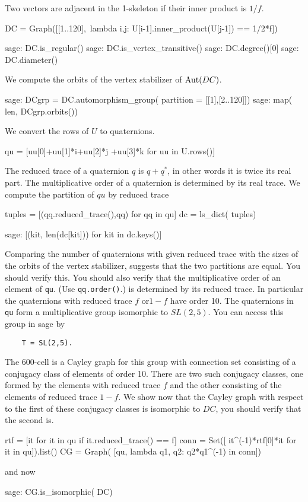 Two vectors are adjacent in the 1-skeleton if their inner product is $1/f$.
\begin{sageblock}
    DC = Graph([[1..120],\
     lambda i,j: U[i-1].inner_product(U[j-1]) == 1/2*f])
\end{sageblock}

\begin{sageexample}
sage: DC.is_regular()
sage: DC.is_vertex_transitive()
sage: DC.degree()[0]
sage: DC.diameter()
\end{sageexample}

We compute the orbits of the vertex stabilizer of $\mathrm{Aut}(DC)$.
\begin{sageexample}
sage: DCgrp = DC.automorphism_group( partition = [[1],[2..120]])
sage: map( len, DCgrp.orbits())
\end{sageexample}

We convert the rows of $U$ to quaternions.
\begin{sageblock}
qu = [uu[0]+uu[1]*i+uu[2]*j +uu[3]*k for uu in U.rows()]
\end{sageblock}
The reduced trace of a quaternion $q$ is $q+q^*$, in other words it is
twice its real part. The multiplicative order of a quaternion is determined
by its real trace. We compute the partition of $qu$ by reduced trace
\begin{sageblock}
tuples = [(qq.reduced_trace(),qq) for qq in qu]
dc = ls_dict( tuples)
\end{sageblock}

\begin{sageexample}
sage: [(kit, len(dc[kit])) for kit in dc.keys()]
\end{sageexample}
Comparing the number of quaternions with given reduced trace with the
sizes of the orbits of the vertex stabilizer, suggests that the two partitions
are equal. You should verify this. You should also verify that the
multiplicative order of an element of \verb|qu|. (Use \verb|qq.order()|.)
is determined by its reduced trace. In particular the quaternions
with reduced trace $f$ or$1-f$ have order 10. The quaternions in
\verb|qu| form a multiplicative group isomorphic to $SL(2,5)$.
You can access this group in sage by
\begin{verbatim}
    T = SL(2,5).
\end{verbatim}

The 600-cell is a Cayley graph for this group with connection
set consisting of a conjugacy class of elements of order 10.
There are two such conjugacy classes, one formed by the elements
with reduced trace $f$ and the other consisting of the elements of reduced
trace $1-f$. We show now that the Cayley graph with respect to the first of these
conjugacy classes is isomorphic to $DC$, you should verify that the second is.
\begin{sageblock}
    rtf = [it for it in qu if it.reduced_trace() == f]
    conn = Set([ it^(-1)*rtf[0]*it for it in qu]).list()
    CG = Graph( [qu, lambda q1, q2: q2*q1^(-1) in conn])
\end{sageblock}
and now
\begin{sageexample}
sage: CG.is_isomorphic( DC)
\end{sageexample}

